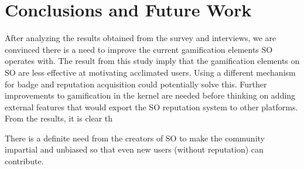\documentclass{sigchi}
\begin{document}
\section{Conclusions and Future Work}

After analyzing the results obtained from the survey and interviews, we are convinced there is a need to improve the current gamification elements SO operates with. The result from this study imply that the gamification elements on SO are less effective at motivating acclimated users. Using a different mechanism for badge and reputation acquisition could potentially solve this. Further improvements to gamification in the kernel are needed before thinking on adding external features that would export the SO reputation system to other platforms. From the results, it is clear th

There is a definite need from the creators of SO to make the community impartial and unbiased so that even new users (without reputation) can contribute.


% 
% 
\end{document}
